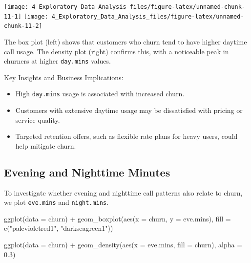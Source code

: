 \documentclass[
  11pt,
]{book}
\makeatletter
\newenvironment{Shaded}{}{}
\newcommand{\AttributeTok}[1]{#1}
\newcommand{\FloatTok}[1]{#1}
\newcommand{\FunctionTok}[1]{#1}
\newcommand{\NormalTok}[1]{#1}
\newcommand{\SpecialCharTok}[1]{\textcolor[rgb]{0.39,0.39,0.39}{#1}}
\newcommand{\StringTok}[1]{\textcolor[rgb]{0.39,0.39,0.39}{#1}}
\providecommand{\tightlist}{%
  \setlength{\itemsep}{0pt}\setlength{\parskip}{0pt}}
\newenvironment{kframe}{%
\medskip{}
\setlength{\fboxsep}{.8em}
 \def\at@end@of@kframe{}%
 \ifinner\ifhmode%
  \def\at@end@of@kframe{\end{minipage}}%
  \begin{minipage}{\columnwidth}%
 \fi\fi%
 \def\FrameCommand##1{\hskip\@totalleftmargin \hskip-\fboxsep
 \colorbox{shadecolor}{##1}\hskip-\fboxsep
     \hskip-\linewidth \hskip-\@totalleftmargin \hskip\columnwidth}%
 \MakeFramed {\advance\hsize-\width
   \@totalleftmargin\z@ \linewidth\hsize
   \@setminipage}}%
 {\par\unskip\endMakeFramed%
 \at@end@of@kframe}
\renewenvironment{Shaded}{\begin{kframe}}{\end{kframe}}
\theoremstyle{definition}
\theoremstyle{definition}
\theoremstyle{definition}
\theoremstyle{definition}
\theoremstyle{remark}
\makeatother
\begin{document}
\texttt{[image: 4\_Exploratory\_Data\_Analysis\_files/figure-latex/unnamed-chunk-11-1]} \texttt{[image: 4\_Exploratory\_Data\_Analysis\_files/figure-latex/unnamed-chunk-11-2]}

The box plot (left) shows that customers who churn tend to have higher daytime call usage. The density plot (right) confirms this, with a noticeable peak in churners at higher \texttt{day.mins} values.

Key Insights and Business Implications:

\begin{itemize}
\tightlist
\item
  High \texttt{day.mins} usage is associated with increased churn.\\
\item
  Customers with extensive daytime usage may be dissatisfied with pricing or service quality.\\
\item
  Targeted retention offers, such as flexible rate plans for heavy users, could help mitigate churn.
\end{itemize}

\subsection*{Evening and Nighttime Minutes}\label{evening-and-nighttime-minutes}


To investigate whether evening and nighttime call patterns also relate to churn, we plot \texttt{eve.mins} and \texttt{night.mins}.

\begin{Shaded}
\begin{Highlighting}[]
\FunctionTok{ggplot}\NormalTok{(}\AttributeTok{data =}\NormalTok{ churn) }\SpecialCharTok{+}
    \FunctionTok{geom\_boxplot}\NormalTok{(}\FunctionTok{aes}\NormalTok{(}\AttributeTok{x =}\NormalTok{ churn, }\AttributeTok{y =}\NormalTok{ eve.mins), }\AttributeTok{fill =} \FunctionTok{c}\NormalTok{(}\StringTok{"palevioletred1"}\NormalTok{, }\StringTok{"darkseagreen1"}\NormalTok{))}

\FunctionTok{ggplot}\NormalTok{(}\AttributeTok{data =}\NormalTok{ churn) }\SpecialCharTok{+}
    \FunctionTok{geom\_density}\NormalTok{(}\FunctionTok{aes}\NormalTok{(}\AttributeTok{x =}\NormalTok{ eve.mins, }\AttributeTok{fill =}\NormalTok{ churn), }\AttributeTok{alpha =} \FloatTok{0.3}\NormalTok{)}
\end{Highlighting}
\end{Shaded}
\end{document}
